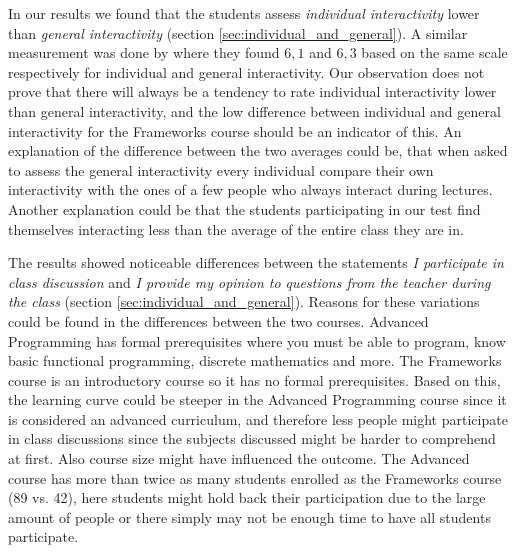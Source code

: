 In our results we found that the students assess \emph{individual interactivity} lower than \emph{general interactivity} (section \ref{sec:individual_and_general}). A similar measurement was done by  where they found $6,1$ and $6,3$ based on the same scale respectively for individual and general interactivity. Our observation does not prove that there will always be a tendency to rate individual interactivity lower than general interactivity, and the low difference between individual and general interactivity for the Frameworks course should be an indicator of this. An explanation of the difference between the two averages could be, that when asked to assess the general interactivity every individual compare their own interactivity with the ones of a few people who always interact during lectures. Another explanation could be that the students participating in our test find themselves interacting less than the average of the entire class they are in.




The results showed noticeable differences between the statements \emph{I participate in class discussion} and \emph{I provide my opinion to questions from the teacher during the class} (section \ref{sec:individual_and_general}). Reasons for these variations could be found in the differences between the two courses. Advanced Programming has formal prerequisites where you must be able to program, know basic functional programming, discrete mathematics and more. The Frameworks course is an introductory course so it has no formal prerequisites. Based on this, the learning curve could be steeper in the Advanced Programming course since it is considered an advanced curriculum, and therefore less people might participate in class discussions since the subjects discussed might be harder to comprehend at first. Also course size might have influenced the outcome. The Advanced course has more than twice as many students enrolled as the Frameworks course (89 vs. 42), here students might hold back their participation due to the large amount of people or there simply may not be enough time to have all students participate.

